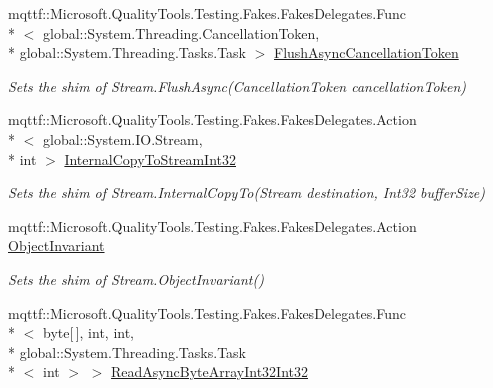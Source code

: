 \begin{DoxyCompactItemize}
mqttf\-::\-Microsoft.\-Quality\-Tools.\-Testing.\-Fakes.\-Fakes\-Delegates.\-Func\\*
$<$ global\-::\-System.\-Threading.\-Cancellation\-Token, \\*
global\-::\-System.\-Threading.\-Tasks.\-Task $>$ \hyperlink{class_system_1_1_i_o_1_1_fakes_1_1_shim_stream_aa3d420c04f944ec8732c12b74a42662b}{Flush\-Async\-Cancellation\-Token}
\begin{DoxyCompactList}\small\item\em Sets the shim of Stream.\-Flush\-Async(\-Cancellation\-Token cancellation\-Token)\end{DoxyCompactList}\item 
mqttf\-::\-Microsoft.\-Quality\-Tools.\-Testing.\-Fakes.\-Fakes\-Delegates.\-Action\\*
$<$ global\-::\-System.\-I\-O.\-Stream, \\*
int $>$ \hyperlink{class_system_1_1_i_o_1_1_fakes_1_1_shim_stream_a9bed7e4185a005a6f1298ee476a6ed2a}{Internal\-Copy\-To\-Stream\-Int32}
\begin{DoxyCompactList}\small\item\em Sets the shim of Stream.\-Internal\-Copy\-To(\-Stream destination, Int32 buffer\-Size)\end{DoxyCompactList}\item 
mqttf\-::\-Microsoft.\-Quality\-Tools.\-Testing.\-Fakes.\-Fakes\-Delegates.\-Action \hyperlink{class_system_1_1_i_o_1_1_fakes_1_1_shim_stream_a2d9143a245d111b94c954b439e544904}{Object\-Invariant}
\begin{DoxyCompactList}\small\item\em Sets the shim of Stream.\-Object\-Invariant()\end{DoxyCompactList}\item 
mqttf\-::\-Microsoft.\-Quality\-Tools.\-Testing.\-Fakes.\-Fakes\-Delegates.\-Func\\*
$<$ byte\mbox{[}$\,$\mbox{]}, int, int, \\*
global\-::\-System.\-Threading.\-Tasks.\-Task\\*
$<$ int $>$ $>$ \hyperlink{class_system_1_1_i_o_1_1_fakes_1_1_shim_stream_ace48edcc00d037371e727d27a009030e}{Read\-Async\-Byte\-Array\-Int32\-Int32}

\end{DoxyCompactItemize}
